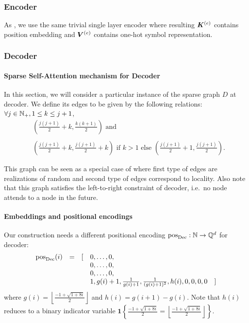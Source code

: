 \subsubsection*{Encoder}
As \citep{Perez19}, we use the same trivial single layer encoder where resulting ${\bm{K}}^{(e)}$ contains position embedding and ${\bm{V}}^{(e)}$ contains one-hot symbol representation.

\subsubsection*{Decoder}
\paragraph{Sparse Self-Attention mechanism for Decoder}
In this section, we will consider a particular instance of the sparse graph $D$ at decoder.
We define its edges to be given by the following relations:
$\forall j\in\mathbb{N}_{+}, 1\leq k\leq j+1$,  
\begin{align*}
&\left(\frac{j(j+1)}{2} + k, \frac{k(k+1)}{2} \right) \text{ and }\\ \\
&\left(\frac{j(j+1)}{2} + k, \frac{j(j+1)}{2} + k \right)  \text{ if } k>1 \text{ else } \left(\frac{j(j+1)}{2} + 1, \frac{j(j+1)}{2} \right).
\end{align*}

This graph can be seen as a special case of \bigb where first type 
of edges are realizations of random and second type of edges correspond to locality.
Also note that this graph satisfies the left-to-right constraint of 
decoder, i.e.~no node attends to a node in the future.


\paragraph{Embeddings and positional encodings}
Our construction needs a different positional encoding $\operatorname{pos}_{\operatorname{Dec}} :\mathbb{N}\to\mathbb{Q}^{d}$ for decoder: 
\begin{equation*}
\begin{array}{rcllr}
\operatorname{pos}_{\operatorname{Dec}}(i) & = & [ 
& 0,\ldots,0, \\
&&& 0,\ldots,0, \\
&&& 0,\ldots,0, \\
&&& 1,g(i)+1,\frac{1}{g(i)+1},\frac{1}{(g(i)+1)^2},h(i),0,0,0,0 & ] 
\end{array}
\end{equation*}
where $g(i) = \left\lfloor \frac{-1+\sqrt{1+8i}}{2} \right\rfloor$ and $h(i) = g(i+1) - g(i)$. Note that $h(i)$ reduces to a binary indicator variable $
\mathbf{1}\left\lbrace\frac{-1+\sqrt{1+8i}}{2}=\left\lfloor \frac{-1+\sqrt{1+8i}}{2} \right\rfloor\right\rbrace$.


